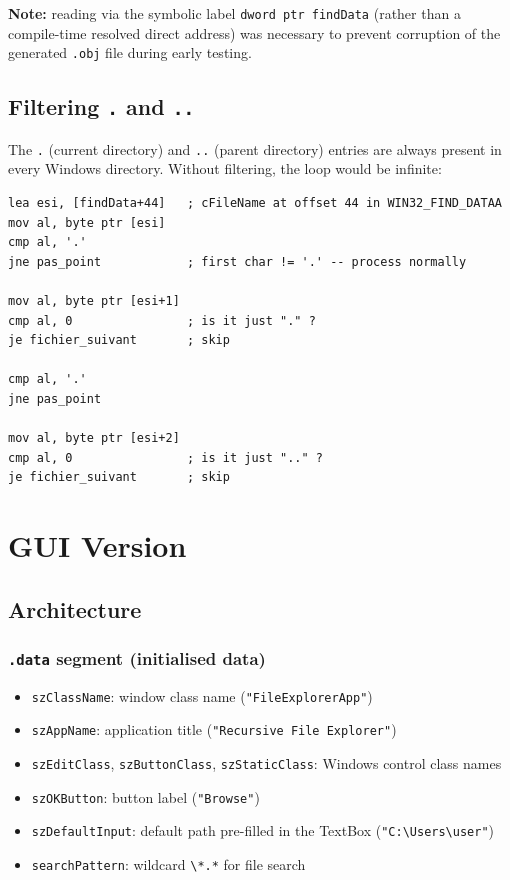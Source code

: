 \documentclass[12pt,a4paper]{article}
\begin{document}
\textbf{Note:} reading via the symbolic label \texttt{dword ptr findData} (rather than a compile-time resolved direct address) was necessary to prevent corruption of the generated \texttt{.obj} file during early testing.

\subsection{Filtering \texttt{.} and \texttt{..}}

The \texttt{.} (current directory) and \texttt{..} (parent directory) entries are always present in every Windows directory. Without filtering, the loop would be infinite:

\begin{lstlisting}
lea esi, [findData+44]   ; cFileName at offset 44 in WIN32_FIND_DATAA
mov al, byte ptr [esi]
cmp al, '.'
jne pas_point            ; first char != '.' -- process normally

mov al, byte ptr [esi+1]
cmp al, 0                ; is it just "." ?
je fichier_suivant       ; skip

cmp al, '.'
jne pas_point

mov al, byte ptr [esi+2]
cmp al, 0                ; is it just ".." ?
je fichier_suivant       ; skip
\end{lstlisting}

\section{GUI Version}

\subsection{Architecture}

\subsubsection{\texttt{.data} segment (initialised data)}

\begin{itemize}
  \item \texttt{szClassName}: window class name (\texttt{"FileExplorerApp"})
  \item \texttt{szAppName}: application title (\texttt{"Recursive File Explorer"})
  \item \texttt{szEditClass}, \texttt{szButtonClass}, \texttt{szStaticClass}: Windows control class names
  \item \texttt{szOKButton}: button label (\texttt{"Browse"})
  \item \texttt{szDefaultInput}: default path pre-filled in the TextBox (\texttt{"C:\textbackslash{}Users\textbackslash{}user"})
  \item \texttt{searchPattern}: wildcard \texttt{\textbackslash{}*.*} for file search
\end{itemize}
\end{document}
